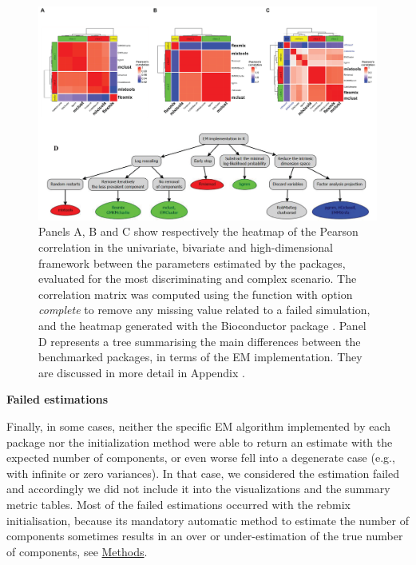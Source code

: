 \begin{figure}

{\centering \includegraphics[width=1\linewidth]{./figs/dichotomy_package_conclusion} 

}

\caption{Panels A, B and C show respectively the heatmap of the Pearson correlation in the univariate, bivariate and high-dimensional framework between the parameters estimated by the packages, evaluated for the most discriminating and complex scenario. The correlation matrix was computed using the function  with option \textit{complete} to remove any missing value related to a failed simulation, and the heatmap generated with the Bioconductor package . Panel D represents a tree summarising the main differences between the benchmarked packages, in terms of the EM implementation. They are discussed in more detail in Appendix .}\label{fig:dichotomy-package-conclusion}
\end{figure}

\textbf{Failed estimations}

Finally, in some cases, neither the specific EM algorithm implemented by each package nor the initialization method were able to return an estimate with the expected number of components, or even worse fell into a degenerate case (e.g., with infinite or zero variances). In that case, we considered the estimation failed and accordingly we did not include it into the visualizations and the summary metric tables. Most of the failed estimations occurred with the rebmix initialisation, because its mandatory automatic method to estimate the number of components sometimes results in an over or under-estimation of the true number of components, see \protect\hyperlink{methods}{Methods}.


